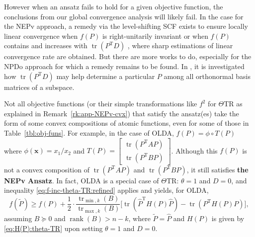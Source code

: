 \documentclass[11pt]{article}
\def\bx{\pmb{x}}
\def\wtd{\widetilde}
\def\what{\widehat}
\DeclareMathOperator{\rank}{rank}
\DeclareMathOperator{\tr}{tr}
\DeclareMathOperator{\T}{T}
\theoremstyle{definition}
\numberwithin{equation}{section}
\begin{document}
%
%
%
%


However when an ansatz fails to hold for a given objective function, the conclusions from
our global convergence analysis will likely fail. In the case for
the NEPv approach, a remedy via the level-shifting SCF exists to ensure locally linear convergence
when $f(P)$ is right-unitarily
invariant \cite{ball:2022} or when $f(P)$ contains and increases with $\tr(P^{\T}D)$ \cite{luli:2024},
where sharp estimations of linear convergence rate are obtained.
But there are more works to do, especially for
the NPDo approach for which a remedy remains to be found. In \cite{teli:2024}, it is investigated how
$\tr(P^{\T}D)$ may help determine a particular $P$ among all orthonormal basis matrices of a subspace.

Not all objective functions (or their simple transformations like $f^2$ for $\Theta$TR as explained in Remark~\ref{rk:app-NEPv-cvx}) that satisfy
the ansatz(es) take the form of some convex compositions of atomic functions, even for some of those in Table~\ref{tbl:obj-funs}.
For example, in the case of OLDA, $f(P)=\phi\circ T(P)$ where $\phi(\bx)=x_1/x_2$ and
$T(P)=\begin{bmatrix}
        \tr(P^{\T}AP)\\
        \tr(P^{\T}BP)
      \end{bmatrix}$.
Although this $f(P)$ is not a convex composition of $\tr(P^{\T}AP)$ and $\tr(P^{\T}BP)$, it still
satisfies {\bf the NEPv Ansatz}. In fact, OLDA is a special case of $\Theta$TR: $\theta=1$ and $D=0$, and
inequality \eqref{eq:f-inc-theta-TR:refined} applies and yields, for OLDA,
$$
f(\wtd P) \ge f(P)+\frac 12\cdot\frac {\tr_{\min,k}(B)}{\tr_{\max,k}(B)}\Big[\tr(\what P^{\T}H(P)\what P)-\tr(P^{\T}H(P)P)\Big],
$$
assuming $B\succeq 0$ and $\rank(B)>n-k$,
where $\wtd P=\what P$ and $H(P)$ is given by \eqref{eq:H(P):theta-TR}
upon setting $\theta=1$ and $D=0$.
\end{document}
